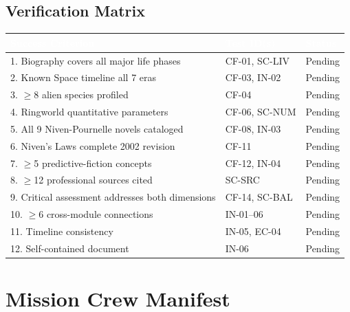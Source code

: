 \documentclass[11pt,letterpaper]{article}
\newcommand{\tableheader}[1]{\textbf{\sffamily\textcolor{white}{#1}}}
\begin{document}
\subsection{Verification Matrix}

\begin{center}
\begin{tabularx}{\textwidth}{XL{3cm}C{1.5cm}}
\toprule
{}
\tableheader{Success Criterion} & \tableheader{Test ID(s)} & \tableheader{Status} \\
. Biography covers all major life phases & CF-01, SC-LIV & Pending \\
2. Known Space timeline all 7 eras & CF-03, IN-02 & Pending \\
3. $\geq$8 alien species profiled & CF-04 & Pending \\
4. Ringworld quantitative parameters & CF-06, SC-NUM & Pending \\
5. All 9 Niven-Pournelle novels cataloged & CF-08, IN-03 & Pending \\
6. Niven's Laws complete 2002 revision & CF-11 & Pending \\
7. $\geq$5 predictive-fiction concepts & CF-12, IN-04 & Pending \\
8. $\geq$12 professional sources cited & SC-SRC & Pending \\
9. Critical assessment addresses both dimensions & CF-14, SC-BAL & Pending \\
10. $\geq$6 cross-module connections & IN-01--06 & Pending \\
11. Timeline consistency & IN-05, EC-04 & Pending \\
12. Self-contained document & IN-06 & Pending \\
\bottomrule
\end{tabularx}
\end{center}

\section{Mission Crew Manifest}
\end{document}
